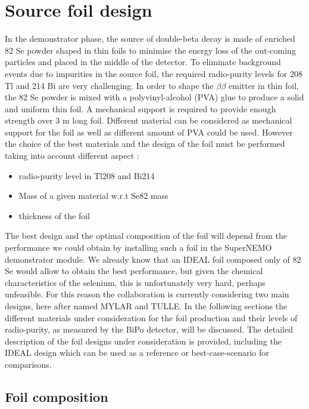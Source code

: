 \documentclass[main.tex]{subfiles}
\begin{document}
\section{Source foil design}


\NI In the demonstrator phase, the source of double-beta decay is made of enriched 82 Se powder shaped in thin foils to minimise the energy loss of the out-coming particles and placed in the middle of the detector. To eliminate background events due to impurities in the source foil, the required radio-purity levels for 208 Tl and 214 Bi are very challenging. In order to shape the $\beta\beta$ emitter in thin foil, the 82 Se powder is mixed with a polyvinyl-alcohol (PVA) glue to produce a solid and uniform thin foil. A mechanical support is required to provide enough strength over 3 m long foil. Different material can be considered as mechanical support for the foil as well as different amount of PVA could be used. However the choice of the best materials and the design of the foil must be performed taking into account different aspect :


\begin{itemize}
\item radio-purity level in Tl208 and Bi214
\item Mass of a given material w.r.t Se82 mass
\item thickness of the foil
\end{itemize}


\NI The best design and the optimal composition of the foil will depend from the performance we could obtain by installing such a foil in the SuperNEMO demonstrator module. We already know that an IDEAL foil composed only of 82 Se would allow to obtain the best performance, but given the chemical characteristics of the selenium, this is unfortunately very hard, perhaps unfeasible. For this reason the collaboration is currently considering two main designs, here after named MYLAR and TULLE. In the following sections the different materials under consideration for the foil production and their levels of radio-purity, as measured by the BiPo detector, will be discussed. The detailed description of the foil designs under consideration is provided, including the IDEAL design which can be used as a reference or best-case-scenario for comparisons.


\subsection{Foil composition}
\end{document}
